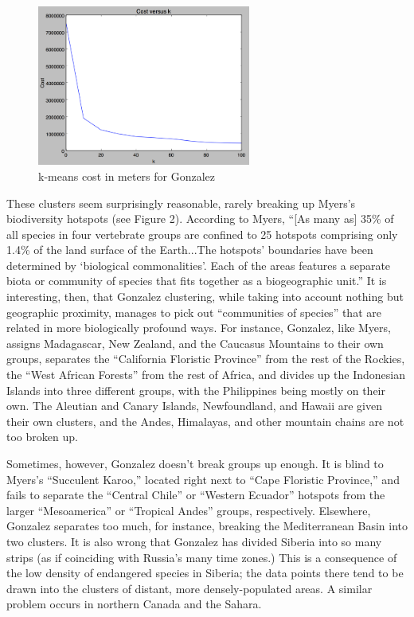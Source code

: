\documentclass[11pt, fullpage,letterpaper]{article}
\begin{document}
		\begin{figure}[H]
			\centering
			\includegraphics[width=7cm]{kMeansCost.png}
			\caption{k-means cost in meters for Gonzalez}
		\end{figure}
			
		These clusters seem surprisingly reasonable, rarely breaking up Myers's biodiversity hotspots (see Figure 2). According to Myers, ``[As many as] 35\% of all species in four vertebrate groups are confined to 25 hotspots comprising only 1.4\% of the land surface of the Earth...The hotspots’ boundaries have been determined by ‘biological commonalities’. Each of the areas features a separate biota or community of species that fits together as a biogeographic unit.'' It is interesting, then, that Gonzalez clustering, while taking into account nothing but geographic proximity, manages to pick out ``communities of species'' that are related in more biologically profound ways. For instance, Gonzalez, like Myers, assigns Madagascar, New Zealand, and the Caucasus Mountains to their own groups, separates the ``California Floristic Province'' from the rest of the Rockies, the ``West African Forests'' from the rest of Africa, and divides up the Indonesian Islands into three different groups, with the Philippines being mostly on their own. The Aleutian and Canary Islands, Newfoundland, and Hawaii are given their own clusters, and the Andes, Himalayas, and other mountain chains are not too broken up. 

		Sometimes, however, Gonzalez doesn't break groups up enough. It is blind to Myers's ``Succulent Karoo,'' located right next to ``Cape Floristic Province,'' and fails to separate the ``Central Chile'' or ``Western Ecuador'' hotspots from the larger ``Mesoamerica'' or ``Tropical Andes'' groups, respectively. Elsewhere, Gonzalez separates too much, for instance, breaking the Mediterranean Basin into two clusters. It is also wrong that Gonzalez has divided Siberia into so many strips (as if coinciding with Russia's many time zones.) This is a consequence of the low density of endangered species in Siberia; the data points there tend to be drawn into the clusters of distant, more densely-populated areas. A similar problem occurs in northern Canada and the Sahara.
\end{document}
